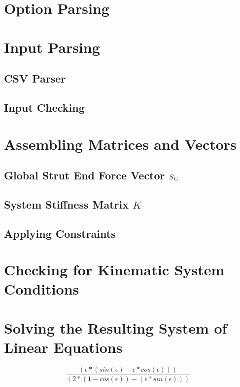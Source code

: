 \section{Option Parsing}
\label{sec:optparse}


\section{Input Parsing}
\label{sec:inputpars}

\subsection{CSV Parser}
\label{sec:csvparse}

\subsection{Input Checking}
\label{sec:inputcheck}


\section{Assembling Matrices and Vectors}
\label{sec:asmmatrvec}

\subsection{Global Strut End Force Vector $S\textsubscript{G}$}
\label{sec:asmSG}

\subsection{System Stiffness Matrix $K$}
\label{sec:asmK}

\subsection{Applying Constraints}
\label{sec:applyconst}


\section{Checking for Kinematic System Conditions}
\label{sec:kinesyscheck}


\section{Solving the Resulting System of Linear Equations}
\label{sec:solver}




\begin{equation} \label{constA}
\frac{(\epsilon * (sin(\epsilon) - \epsilon * cos(\epsilon)))}
{(2 * (1 - cos(\epsilon)) - (\epsilon * sin(\epsilon)))}
\end{equation}